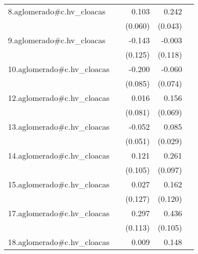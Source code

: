 {\begin{longtable}{l*{4}{D{.}{.}{-1}}}
\addlinespace
8.aglomerado#c.hv\_cloacas&                     &       0.103         &       0.242\sym{***}&                     \\
            &                     &     (0.060)         &     (0.043)         &                     \\
\addlinespace
9.aglomerado#c.hv\_cloacas&                     &      -0.143         &      -0.003         &                     \\
            &                     &     (0.125)         &     (0.118)         &                     \\
\addlinespace
10.aglomerado#c.hv\_cloacas&                     &      -0.200\sym{*}  &      -0.060         &                     \\
            &                     &     (0.085)         &     (0.074)         &                     \\
\addlinespace
12.aglomerado#c.hv\_cloacas&                     &       0.016         &       0.156\sym{*}  &                     \\
            &                     &     (0.081)         &     (0.069)         &                     \\
\addlinespace
13.aglomerado#c.hv\_cloacas&                     &      -0.052         &       0.085\sym{**} &                     \\
            &                     &     (0.051)         &     (0.029)         &                     \\
\addlinespace
14.aglomerado#c.hv\_cloacas&                     &       0.121         &       0.261\sym{**} &                     \\
            &                     &     (0.105)         &     (0.097)         &                     \\
\addlinespace
15.aglomerado#c.hv\_cloacas&                     &       0.027         &       0.162         &                     \\
            &                     &     (0.127)         &     (0.120)         &                     \\
\addlinespace
17.aglomerado#c.hv\_cloacas&                     &       0.297\sym{**} &       0.436\sym{***}&                     \\
            &                     &     (0.113)         &     (0.105)         &                     \\
\addlinespace
18.aglomerado#c.hv\_cloacas&                     &       0.009         &       0.148\sym{***}&                     \\

\end{longtable}}
